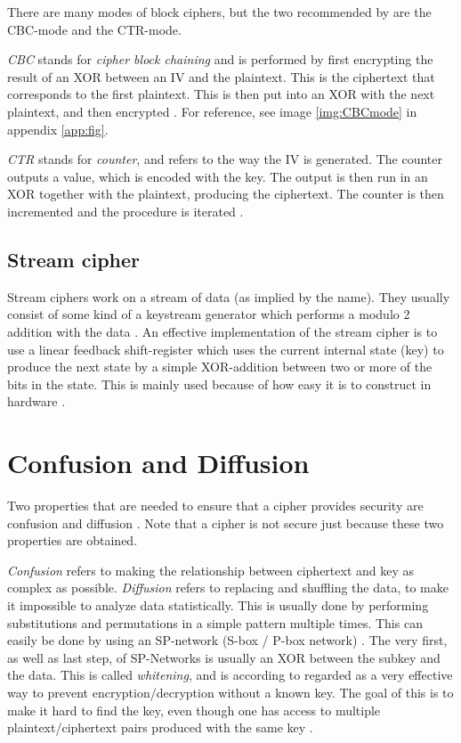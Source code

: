 There are many modes of block ciphers, but the two recommended by 
\citet{Schneier:2003} are the CBC-mode and the CTR-mode.

\emph{CBC} stands for \emph{cipher block chaining} and is performed by 
first encrypting the result of an XOR between an IV and the plaintext. 
This is the ciphertext that corresponds to the first plaintext. This is 
then put into an XOR with the next plaintext, and then encrypted 
\citep[pp. 109--111]{Stinson:2006}. For reference, see image 
\ref{img:CBCmode} in appendix \ref{app:fig}.

\emph{CTR} stands for \emph{counter}, and refers to the way the IV is 
generated. The counter outputs a value, which is encoded with the key. 
The output is then run in an XOR together with the plaintext, producing 
the ciphertext. The counter is then incremented and the procedure is 
iterated \citep[p. 111]{Stinson:2006}.

\subsection{Stream cipher} \label{sec:StreamCipher}
Stream ciphers work on a stream of data (as implied by the name). They 
usually consist of some kind of a keystream generator which performs a 
modulo 2 addition with the data \cite[pp. 67]{Simmons:1992}. An 
effective implementation of the stream cipher is to use a linear 
feedback shift-register which uses the current internal state (key) to 
produce the next state by a simple XOR-addition between two or more of 
the bits in the state. This is mainly used because of how easy it is to 
construct in hardware \citep{LFSR:2008}.

\section{Confusion and Diffusion}\label{ch:ConfDiff}
Two properties that are needed to ensure that a cipher provides 
security are confusion and diffusion \citep{Shannon:1949}. Note that a 
cipher is not secure just because these two properties are obtained.

\emph{Confusion} refers to making the relationship between ciphertext 
and key as complex as possible. \emph{Diffusion} refers to replacing 
and shuffling the data, to make it impossible to analyze data 
statistically. This is usually done by performing substitutions and 
permutations in a simple pattern multiple times. This can easily be 
done by using an SP-network (S-box / P-box network) 
\citep[pp. 74--79]{Stinson:2006}. The very first, as well as last step, 
of SP-Networks is usually an XOR between the subkey and the data. This 
is called \emph{whitening}, and is according to 
\citet[p. 75]{Stinson:2006} regarded as a very effective way to prevent 
encryption/decryption without a known key. The goal of this is to make 
it hard to find the key, even though one has access to multiple 
plaintext/ciphertext pairs produced with the same key 
\citep{Shannon:1949}.

